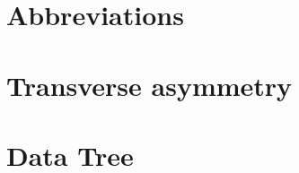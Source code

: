 \begin{appendices}

\section{Abbreviations}

\section{Transverse asymmetry}

\section{Data Tree}


\end{appendices}